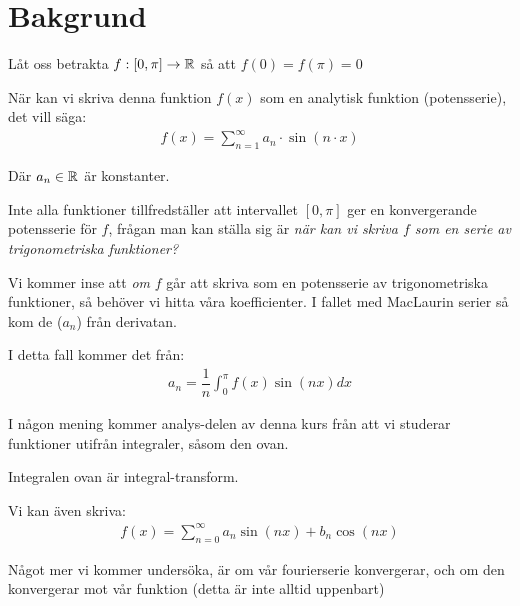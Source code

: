 \section{Bakgrund}\par
\noindent Låt oss betrakta $f:[0,\pi]\to\mathbb{R}$ så att $f(0) = f(\pi) = 0$\par
\noindent När kan vi skriva denna funktion $f(x)$ som en analytisk funktion (potensserie), det vill säga:
\begin{equation}
  \begin{gathered}
    f(x) = \sum_{n=1}^{\infty} a_n\cdot\sin(n\cdot x)
  \end{gathered}
\end{equation}\par
\noindent Där $a_n\in\mathbb{R}$ är konstanter.
\par\bigskip
\noindent Inte alla funktioner tillfredställer att intervallet $[0,\pi]$ ger en konvergerande potensserie för $f$, frågan man kan ställa sig är \textit{när kan vi skriva $f$ som en serie av trigonometriska funktioner?} 
\par\bigskip
\noindent Vi kommer inse att \textit{om} $f$ går att skriva som en potensserie av trigonometriska funktioner, så behöver vi hitta våra koefficienter. I fallet med MacLaurin serier så kom de ($a_n$) från derivatan.\par
\noindent I detta fall kommer det från:
\begin{equation*}
  \begin{gathered}
    a_n  = \dfrac{1}{n}\int_{0}^{\pi}f(x)\sin(nx)dx
  \end{gathered}
\end{equation*}
\par\bigskip
\noindent I någon mening kommer analys-delen av denna kurs från att vi studerar funktioner utifrån integraler, såsom den ovan.\par
\noindent Integralen ovan är integral-transform. 
\par\bigskip
\noindent Vi kan även skriva:
\begin{equation*}
  \begin{gathered}
    f(x) = \sum_{n=0}^{\infty}a_n\sin(nx)+b_n\cos(nx)
  \end{gathered}
\end{equation*}
\par\bigskip
\noindent Något mer vi kommer undersöka, är om vår fourierserie konvergerar, och om den konvergerar mot vår funktion (detta är inte alltid uppenbart) 
